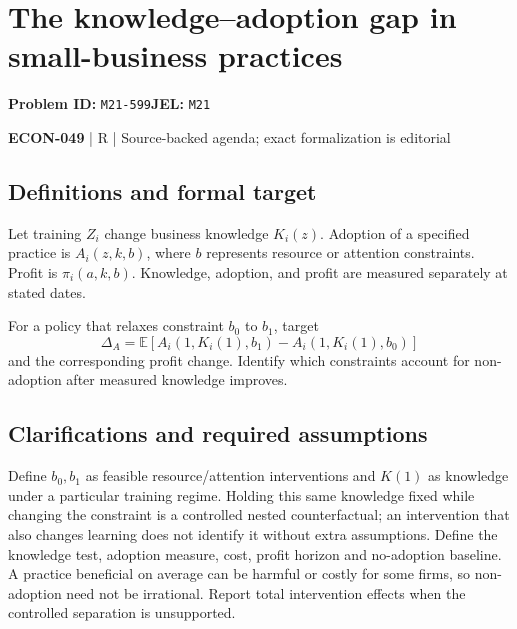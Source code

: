 \documentclass[11pt,a4paper]{article}
\begin{document}
\section*{The knowledge–adoption gap in small-business practices}
\textbf{Problem ID:} \texttt{M21-599}\quad \textbf{JEL:} \texttt{M21}\par
\label{problem:OP-0619}


\label{audited:ECON-049}

{\sffamily\small\color{muted}\textbf{ECON-049} | R | Source-backed agenda; exact formalization is editorial\par}

\subsection*{Definitions and formal target}

Let training $Z_i$ change business knowledge $K_i(z)$. Adoption of a specified practice is $A_i(z,k,b)$, where $b$ represents resource or attention constraints. Profit is $\pi_i(a,k,b)$. Knowledge, adoption, and profit are measured separately at stated dates.

For a policy that relaxes constraint $b_0$ to $b_1$, target
\[
 \Delta_A=\mathbb E[A_i(1,K_i(1),b_1)-A_i(1,K_i(1),b_0)]
\]
and the corresponding profit change. Identify which constraints account for non-adoption after measured knowledge improves.

\subsection*{Clarifications and required assumptions}

Define \(b_0,b_1\) as feasible resource/attention interventions and \(K(1)\) as knowledge under a particular training regime. Holding this same knowledge fixed while changing the constraint is a controlled nested counterfactual; an intervention that also changes learning does not identify it without extra assumptions. Define the knowledge test, adoption measure, cost, profit horizon and no-adoption baseline. A practice beneficial on average can be harmful or costly for some firms, so non-adoption need not be irrational. Report total intervention effects when the controlled separation is unsupported.
\end{document}
